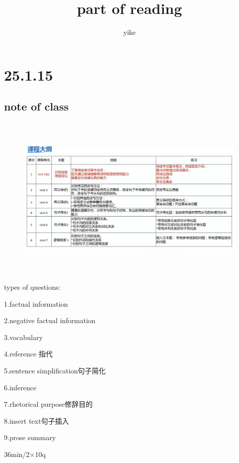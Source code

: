 \documentclass[a4paper, 10pt]{article}
\begin{document}
\title{{ \textbf {part of reading}}}
  \author{yike}
  \date{}
  
  \maketitle
\section{25.1.15}
\subsection{note of class}
\begin{figure}[ht]
    \centering 
    \includegraphics[height=8cm,width=14.5cm]{pic1.png}
    
    
    \label{2}
    
    \end{figure}
types of questions:

1.factual information

2.negative factual information

3.vocabulary

4.reference 指代

5.sentence simplification句子简化

6.inference

7.rhetorical purpose修辞目的

8.insert text句子插入

9.prose summary

36min/2×10q
\end{document}
